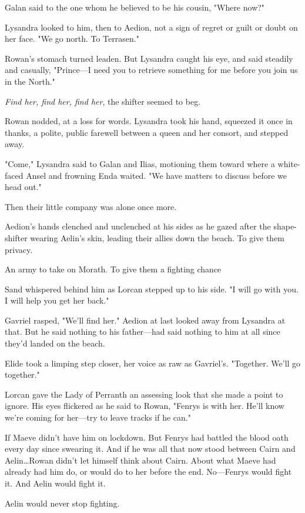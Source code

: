 Galan said to the one whom he believed to be his cousin, "Where now?"

Lysandra looked to him, then to Aedion, not a sign of regret or guilt or doubt on her face.
"We go north.
To Terrasen."

Rowan's stomach turned leaden.
But Lysandra caught his eye, and said steadily and casually, "Prince---I need you to retrieve something for me before you join us in the North."

\emph{Find her, find her, find her}, the shifter seemed to beg.

Rowan nodded, at a loss for words.
Lysandra took his hand, squeezed it once in thanks, a polite, public farewell between a queen and her consort, and stepped away.

"Come," Lysandra said to Galan and Ilias, motioning them toward where a white-faced Ansel and frowning Enda waited.
"We have matters to discuss before we head out."

Then their little company was alone once more.

Aedion's hands clenched and unclenched at his sides as he gazed after the shape-shifter wearing Aelin's skin, leading their allies down the beach.
To give them privacy.

An army to take on Morath.
To give them a fighting chance 

Sand whispered behind him as Lorcan stepped up to his side.
"I will go with you.
I will help you get her back."

Gavriel rasped, "We'll find her."
Aedion at last looked away from Lysandra at that.
But he said nothing to his father---had said nothing to him at all since they'd landed on the beach.

Elide took a limping step closer, her voice as raw as Gavriel's.
"Together.
We'll go together."

Lorcan gave the Lady of Perranth an assessing look that she made a point to ignore.
His eyes flickered as he said to Rowan, "Fenrys is with her.
He'll know we're coming for her---try to leave tracks if he can."

If Maeve didn't have him on lockdown.
But Fenrys had battled the blood oath every day since swearing it.
And if he was all that now stood between Cairn and Aelin\ldots Rowan didn't let himself think about Cairn.
About what Maeve had already had him do, or would do to her before the end.
No---Fenrys would fight it.
And Aelin would fight it.

Aelin would never stop fighting.

